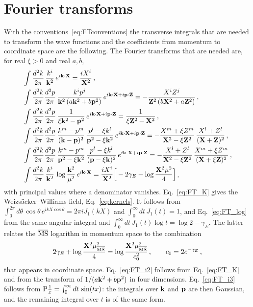 \section{Fourier transforms}\label{app:fourier}

With the conventions~\eqref{eq:FTconventions} the transverse integrals that are needed to transform the wave functions and the coefficients from momentum to coordinate space are the following. The Fourier transforms that are needed are, for real $\xi>0$ and real $a,b$,
\begin{align}
&\int\frac{d^2k}{2\pi}\,\frac{k^i}{\mathbf{k}^2}\,e^{i\mathbf{k}\cdot\mathbf{X}}=\frac{iX^i}{\mathbf{X}^2}\,,\label{eq:FT_K}\\
&\int\frac{d^2k}{2\pi}\frac{d^2p}{2\pi}\,\frac{k^ip^j}{\mathbf{k}^2\,(a\mathbf{k}^2+b\mathbf{p}^2)}\,e^{i\mathbf{k}\cdot\mathbf{X}+i\mathbf{p}\cdot\mathbf{Z}}=-\frac{X^iZ^j}{\mathbf{Z}^2\,(b\mathbf{X}^2+a\mathbf{Z}^2)}\,,\label{eq:FT_i2}\\
&\int\frac{d^2k}{2\pi}\frac{d^2p}{2\pi}\,\frac{1}{\xi\mathbf{k}^2-\mathbf{p}^2}\,e^{i\mathbf{k}\cdot\mathbf{X}+i\mathbf{p}\cdot\mathbf{Z}}=\frac{1}{\xi\mathbf{Z}^2-\mathbf{X}^2}\,,\label{eq:FT_i3}\\
&\int\frac{d^2k}{2\pi}\frac{d^2p}{2\pi}\,\frac{k^m-p^m}{(\mathbf{k}-\mathbf{p})^2}\,\frac{p^l-\xi k^l}{\mathbf{p}^2-\xi\mathbf{k}^2}\,e^{i\mathbf{k}\cdot\mathbf{X}+i\mathbf{p}\cdot\mathbf{Z}}=-\frac{X^m+\xi Z^m}{\mathbf{X}^2-\xi\mathbf{Z}^2}\,\frac{X^l+Z^l}{(\mathbf{X}+\mathbf{Z})^2}\,,\label{eq:FT_i4}\\
&\int\frac{d^2k}{2\pi}\frac{d^2p}{2\pi}\,\frac{k^m-p^m}{\mathbf{p}^2-\xi\mathbf{k}^2}\,\frac{p^l-\xi k^l}{(\mathbf{p}-\xi\mathbf{k})^2}\,e^{i\mathbf{k}\cdot\mathbf{X}+i\mathbf{p}\cdot\mathbf{Z}}=-\frac{X^l+Z^l}{\mathbf{X}^2-\xi\mathbf{Z}^2}\,\frac{X^m+\xi Z^m}{(\mathbf{X}+\xi\mathbf{Z})^2}\,,\label{eq:FT_i5}\\
&\int\frac{d^2k}{2\pi}\,\frac{k^i}{\mathbf{k}^2}\,\log\frac{\mathbf{k}^2}{\mu^2}\,e^{i\mathbf{k}\cdot\mathbf{X}}=\frac{iX^i}{\mathbf{X}^2}\Big[-2\gamma_E-\log\frac{\mathbf{X}^2\mu^2}{4}\Big]\,,\label{eq:FT_log}
\end{align}
with principal values where a denominator vanishes. Eq.~\eqref{eq:FT_K} gives the Weizs\"acker--Williams field, Eq.~\eqref{eq:kernels}. It follows from $\int_0^{2\pi}d\theta\,\cos\theta\,e^{ikX\cos\theta}=2\pi iJ_1(kX)$ and $\int_0^\infty dt\,J_1(t)=1$, and Eq.~\eqref{eq:FT_log} from the same angular integral and $\int_0^\infty dt\,J_1(t)\log t=\log2-\gamma_E$. The latter relates the $\overline{\rm MS}$ logarithm in momentum space to the combination
\begin{align}\label{eq:c0}
2\gamma_E+\log\frac{\mathbf{X}^2\mu^2_{\overline{\rm MS}}}{4}=\log\frac{\mathbf{X}^2\mu^2_{\overline{\rm MS}}}{c_0^2}\,,\qquad c_0=2e^{-\gamma_E}\,,
\end{align}
that appears in coordinate space. Eq.~\eqref{eq:FT_i2} follows from Eq.~\eqref{eq:FT_K} and from the transform of $1/(a\mathbf{k}^2+b\mathbf{p}^2)$ in four dimensions. Eq.~\eqref{eq:FT_i3} follows from $\mathrm{P}\frac1x=\int_0^\infty dt\,\sin(tx)$: the integrals over $\mathbf{k}$ and $\mathbf{p}$ are then Gaussian, and the remaining integral over $t$ is of the same form.

